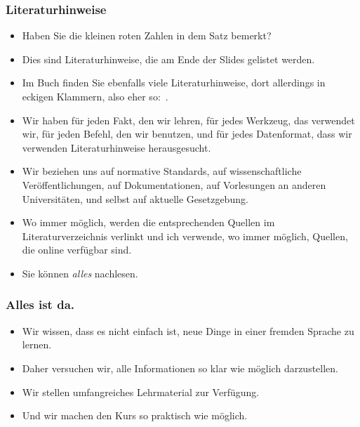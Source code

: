 \documentclass[aspectratio=169,mathserif,notheorems]{beamer}%
\begin{document}
\begin{frame}%
\frametitle{Literaturhinweise}%
\begin{itemize}%
\item Haben Sie die kleinen roten Zahlen in dem Satz \emph{} bemerkt?%
\item<2-> Dies sind Literaturhinweise, die am Ende der Slides gelistet werden.%
\item<3-> Im Buch \cite{programmingWithPython} finden Sie ebenfalls viele Literaturhinweise, dort allerdings in eckigen Klammern, also eher so:~.%
\item<4-> Wir haben für jeden Fakt, den wir lehren, für jedes Werkzeug, das verwendet wir, für jeden Befehl, den wir benutzen, und für jedes Datenformat, dass wir verwenden Literaturhinweise herausgesucht.%
\item<5-> Wir beziehen uns auf normative Standards, auf wissenschaftliche Veröffentlichungen, auf Dokumentationen, auf Vorlesungen an anderen Universitäten, und selbst auf aktuelle Gesetzgebung.%
\item<6-> Wo immer möglich, werden die entsprechenden Quellen im Literaturverzeichnis verlinkt und ich verwende, wo immer möglich, Quellen, die online verfügbar sind.%
\item<7-> Sie können \emph{alles} nachlesen.%
\end{itemize}%
\end{frame}%
%
\begin{frame}%
\frametitle{Alles ist da.}%
\begin{itemize}%
\item Wir wissen, dass es nicht einfach ist, neue Dinge in einer fremden Sprache zu lernen.%
\item<2-> Daher versuchen wir, alle Informationen so klar wie möglich darzustellen.%
\item<3-> Wir stellen umfangreiches Lehrmaterial zur Verfügung.%
\item<4-> Und wir machen den Kurs so praktisch wie möglich.%
\end{itemize}%
\end{frame}%
%
\end{document}
